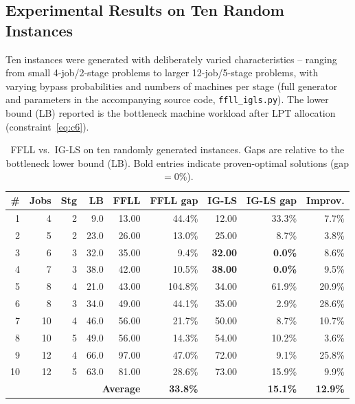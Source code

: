 \documentclass[11pt,a4paper]{article}
\begin{document}
\subsection{Experimental Results on Ten Random Instances}

Ten instances were generated with deliberately varied characteristics --
ranging from small 4-job/2-stage problems to larger 12-job/5-stage
problems, with varying bypass probabilities and numbers of machines per
stage (full generator and parameters in the accompanying source code,
\texttt{ffll\_igls.py}). The lower bound (LB) reported is the bottleneck
machine workload after LPT allocation (constraint~\eqref{eq:c6}).

\begin{table}[h!]
\centering
\small
\begin{tabular}{@{}rrrrrrrrr@{}}
\toprule
\# & Jobs & Stg & LB & FFLL & FFLL gap & IG-LS & IG-LS gap & Improv. \\
\midrule
1  & 4  & 2 & 9.0  & 13.00 & 44.4\%  & 12.00 & 33.3\% & 7.7\%  \\
2  & 5  & 2 & 23.0 & 26.00 & 13.0\%  & 25.00 & 8.7\%  & 3.8\%  \\
3  & 6  & 3 & 32.0 & 35.00 & 9.4\%   & \textbf{32.00} & \textbf{0.0\%} & 8.6\%  \\
4  & 7  & 3 & 38.0 & 42.00 & 10.5\%  & \textbf{38.00} & \textbf{0.0\%} & 9.5\%  \\
5  & 8  & 4 & 21.0 & 43.00 & 104.8\% & 34.00 & 61.9\% & 20.9\% \\
6  & 8  & 3 & 34.0 & 49.00 & 44.1\%  & 35.00 & 2.9\%  & 28.6\% \\
7  & 10 & 4 & 46.0 & 56.00 & 21.7\%  & 50.00 & 8.7\%  & 10.7\% \\
8  & 10 & 5 & 49.0 & 56.00 & 14.3\%  & 54.00 & 10.2\% & 3.6\%  \\
9  & 12 & 4 & 66.0 & 97.00 & 47.0\%  & 72.00 & 9.1\%  & 25.8\% \\
10 & 12 & 5 & 63.0 & 81.00 & 28.6\%  & 73.00 & 15.9\% & 9.9\%  \\
\midrule
\multicolumn{5}{r}{\textbf{Average}} & \textbf{33.8\%} & & \textbf{15.1\%} & \textbf{12.9\%} \\
\bottomrule
\end{tabular}
\caption{FFLL vs.\ IG-LS on ten randomly generated instances. Gaps are
  relative to the bottleneck lower bound (LB). Bold entries indicate
  proven-optimal solutions (gap $=0\%$).}
\label{tab:results}
\end{table}
\end{document}
